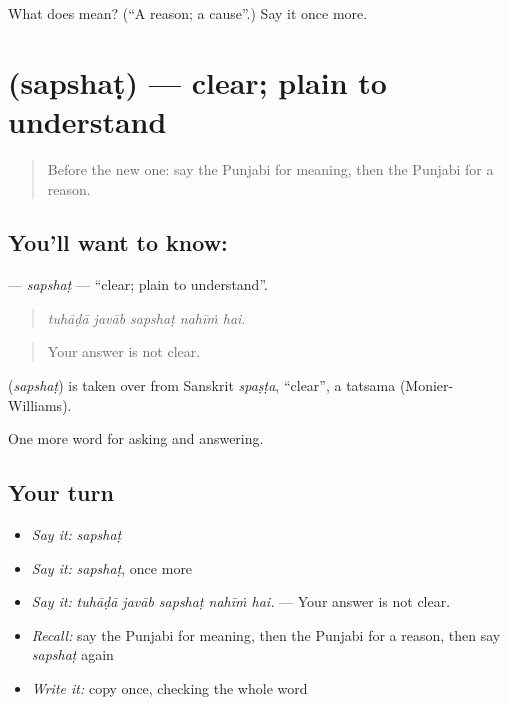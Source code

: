 \begin{tcolorbox}[breakable,colback=teal!4,colframe=teal!35!black,title={Before you move on}]
What does  mean? (\textquotedblleft{}A reason; a cause\textquotedblright{}.) Say it once more.
\end{tcolorbox}
\section[\texorpdfstring{\pa{ਸਪਸ਼ਟ} (sapshaṭ)}{ਸਪਸ਼ਟ (sapshaṭ)}]{ (sapshaṭ) — clear; plain to understand}

\label{lesson:PA-C342-sapshat}



\begin{quote}
Before the new one: say the Punjabi for meaning, then the Punjabi for a reason.
\end{quote}

\subsection*{You'll want to know: }
\textbf{} — \emph{sapshaṭ} — \textquotedblleft{}clear; plain to understand\textquotedblright{}.

\begin{quote}
    
\end{quote}

\begin{quote}
\emph{tuhāḍā javāb sapshaṭ nahīṁ hai.}
\end{quote}

\begin{quote}
Your answer is not clear.
\end{quote}

\begin{cousinweb}
\textbf{} (\emph{sapshaṭ}) is taken over from Sanskrit \emph{spaṣṭa}, \textquotedblleft{}clear\textquotedblright{}, a tatsama (Monier-Williams).
\end{cousinweb}

\begin{grammarlens}[title={What you've built}]
One more word for asking and answering.
\end{grammarlens}

\subsection*{Your turn}
\begin{itemize}
\raggedright
  \item \emph{Say it:} \emph{sapshaṭ}
  \item \emph{Say it:} \emph{sapshaṭ}, once more
  \item \emph{Say it:} \emph{tuhāḍā javāb sapshaṭ nahīṁ hai.} — Your answer is not clear.
  \item \emph{Recall:} say the Punjabi for meaning, then the Punjabi for a reason, then say \emph{sapshaṭ} again
  \item \emph{Write it:} copy \textbf{} once, checking the whole word
\end{itemize}

